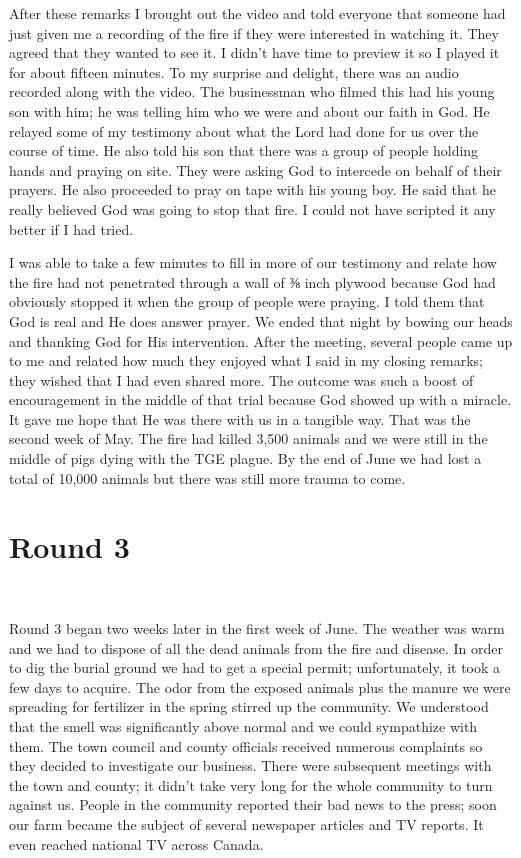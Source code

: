 \documentclass[oneside]{book}
\begin{document}
After these remarks I brought out the video and told everyone that someone had just given me a recording of the fire if they were interested in watching it. They agreed that they wanted to see it. I didn't have time to preview it so I played it for about fifteen minutes. To my surprise and delight, there was an audio recorded along with the video. The businessman who filmed this had his young son with him; he was telling him who we were and about our faith in God. He relayed some of my testimony about what the Lord had done for us over the course of time. He also told his son that there was a group of people holding hands and praying on site. They were asking God to intercede on behalf of their prayers. He also proceeded to pray on tape with his young boy. He said that he really believed God was going to stop that fire. I could not have scripted it any better if I had tried. 

I was able to take a few minutes to fill in more of our testimony and relate how the fire had not penetrated through a wall of ⅜ inch plywood because God had obviously stopped it when the group of people were praying. I told them that God is real and He does answer prayer. We ended that night by bowing our heads and thanking God for His intervention. After the meeting, several people came up to me and related how much they enjoyed what I said in my closing remarks; they wished that I had even shared more. The outcome was such a boost of encouragement in the middle of that trial because God showed up with a miracle. It gave me hope that He was there with us in a tangible way. That was the second week of May. The fire had killed 3,500 animals and we were still in the middle of pigs dying with the TGE plague. By the end of June we had lost a total of 10,000 animals but there was still more trauma to come.


\section{Round 3}
\

Round 3 began two weeks later in the first week of June. The weather was warm and we had to dispose of all the dead animals from the fire and disease. In order to dig the burial ground we had to get a special permit; unfortunately, it took a few days to acquire. The odor from the exposed animals plus the manure we were spreading for fertilizer in the spring stirred up the community. We understood that the smell was significantly above normal and we could sympathize with them. The town council and county officials received numerous complaints so they decided to investigate our business. There were subsequent meetings with the town and county; it didn't take very long for the whole community to turn against us. People in the community reported their bad news to the press; soon our farm became the subject of several newspaper articles and TV reports. It even reached national TV across Canada. 
\end{document}
